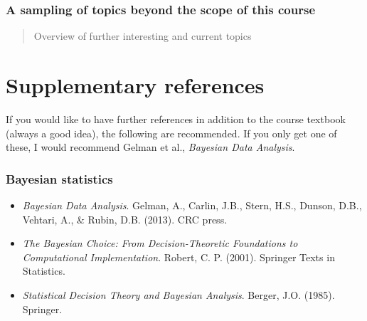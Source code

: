 \documentclass[12pt]{article}
\begin{document}



\subsubsection*{A sampling of topics beyond the scope of this course}
\begin{quote}
Overview of further interesting and current topics
\end{quote}



\section{Supplementary references}

If you would like to have further references in addition to the course textbook (always a good idea), the following are recommended. If you only get one of these, I would recommend Gelman et al., \textit{Bayesian Data Analysis}.

\subsubsection*{Bayesian statistics}
\begin{itemize}
\item[] \textit{Bayesian Data Analysis}. Gelman, A., Carlin, J.B., Stern, H.S., Dunson, D.B., Vehtari, A., \& Rubin, D.B. (2013). CRC press.
\item[] \textit{The Bayesian Choice: From Decision-Theoretic Foundations to Computational Implementation}. Robert, C. P. (2001). Springer Texts in Statistics.
\item[] \textit{Statistical Decision Theory and Bayesian Analysis}. Berger, J.O. (1985). Springer.
\end{itemize}
\end{document}

